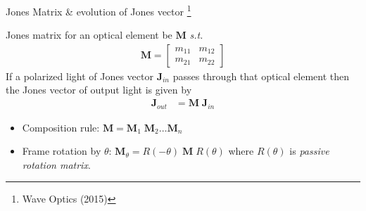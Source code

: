 \documentclass[12pt, dvipsnames]{beamer}
\numberwithin{equation}{section}
\newcommand\blfootnote[1]{%
	\begingroup
	\renewcommand\thefootnote{}\footnote{#1}%
	\addtocounter{footnote}{-1}%
	\endgroup
}
\begin{document}
\begin{frame}{Jones Matrix \& evolution of Jones vector}\blfootnote{Wave Optics (2015)}
	Jones matrix for an optical element be $\boldsymbol{M}$ \textit{s.t.} 
	\begin{align*}\boldsymbol{M}=
		\begin{bmatrix}
			m_{11} & m_{12}\\
			m_{21} & m_{22}
		\end{bmatrix}
	\end{align*}\pause
	If a polarized light of Jones vector $\boldsymbol{J}_{in}$ passes through that optical element then the Jones vector of output light is given by 
	\begin{align*}
		\boldsymbol{J}_{out}&=\boldsymbol{M}\;\boldsymbol{J}_{in}
	\end{align*}\pause
	\begin{itemize}
		\item Composition rule: 
		$\boldsymbol{M}=\boldsymbol{M}_1\;\boldsymbol{M}_2\dots\boldsymbol{M}_n$
		
		\item Frame rotation by $\theta$: 
		$\boldsymbol{M}_\theta = R(-\theta)\;\boldsymbol{M}\;R(\theta)$
		where $R(\theta)$ is \textit{passive rotation matrix}.
	\end{itemize}

\end{frame}
\end{document}
